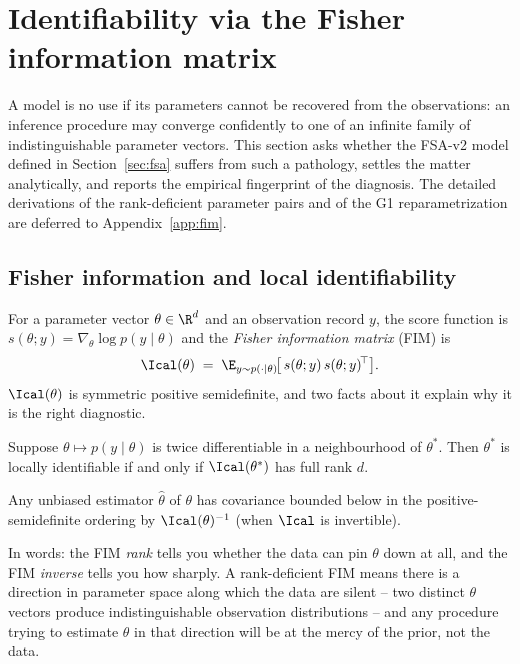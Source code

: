\section{Identifiability via the Fisher information matrix}\label{sec:fim}

A model is no use if its parameters cannot be recovered from the
observations: an inference procedure may converge confidently to one
of an infinite family of indistinguishable parameter vectors. This
section asks whether the FSA-v2 model defined in
Section~\ref{sec:fsa} suffers from such a pathology, settles the
matter analytically, and reports the empirical fingerprint of the
diagnosis. The detailed derivations of the rank-deficient parameter
pairs and of the G1 reparametrization are deferred to
Appendix~\ref{app:fim}.

\subsection{Fisher information and local identifiability}\label{sec:fim-def}

For a parameter vector $\theta \in \R^d$ and an observation record
$y$, the score function is
$s(\theta;y) = \nabla_\theta \log p(y\mid\theta)$ and the
\emph{Fisher information matrix} (FIM) is
\begin{equation}
  \Ical(\theta) \;=\;
    \E_{y \sim p(\cdot\mid\theta)}\!\bigl[\,s(\theta;y)\,s(\theta;y)^{\!\top}\bigr].
  \label{eq:fim-def}
\end{equation}
$\Ical(\theta)$ is symmetric positive semidefinite, and two facts
about it explain why it is the right diagnostic.

\begin{proposition}\label{prop:fim-id}
Suppose $\theta \mapsto p(y\mid\theta)$ is twice differentiable in a
neighbourhood of $\theta^*$. Then $\theta^*$ is locally identifiable
if and only if $\Ical(\theta^*)$ has full rank $d$.
\end{proposition}

\begin{proposition}\label{prop:fim-cr}
Any unbiased estimator $\hat\theta$ of $\theta$ has covariance bounded
below in the positive-semidefinite ordering by $\Ical(\theta)^{-1}$
(when $\Ical$ is invertible).
\end{proposition}

In words: the FIM \emph{rank} tells you whether the data can pin
$\theta$ down at all, and the FIM \emph{inverse} tells you how
sharply. A rank-deficient FIM means there is a direction in
parameter space along which the data are silent -- two distinct
$\theta$ vectors produce indistinguishable observation distributions
-- and any procedure trying to estimate $\theta$ in that direction
will be at the mercy of the prior, not the data.

